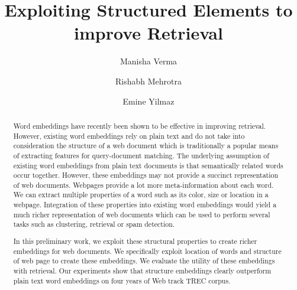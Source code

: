 \documentclass[sigconf]{acmart}
\begin{document}
\title{Exploiting Structured Elements to improve Retrieval}
  
  \author{Manisha Verma}


\author{Rishabh Mehrotra}

\author{Emine Yilmaz}
\begin{abstract}
Word embeddings have recently been shown to be effective in improving retrieval. 
However, existing word embeddings rely on plain text and do not take into consideration the 
structure of a web document which is traditionally a popular means of extracting 
features for query-document matching. The underlying assumption of existing word embeddings 
from plain text documents is that semantically related words occur together. However, 
these embeddings may not provide a succinct representation of web documents. Webpages provide  
a lot more meta-information about each word. We can extract multiple properties of a word such 
as its color, size or location in a webpage. Integration of these properties into existing word 
embeddings would yield a much richer representation of web documents which can be used to perform 
several tasks such as clustering, retrieval or spam detection. 

In this preliminary work, we exploit these structural properties to create 
richer embeddings for web documents. We specifically exploit location of words and structure 
of web page to create these embeddings. We evaluate the utility of these embeddings with retrieval. 
Our experiments show that structure embeddings clearly outperform plain text word embeddings 
on four years of Web track TREC corpus. 

\end{abstract}

%
%
\end{document}
